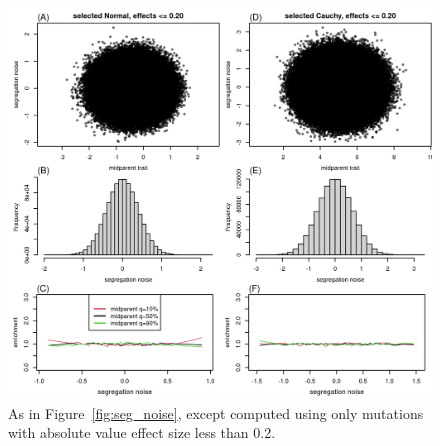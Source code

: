 \documentclass{article}
\newcommand{\1}{\mathbbm{1}}
\theoremstyle{remark}
\theoremstyle{definition}
\newif\ifsubmission
\begin{document}
\begin{figure}
    \begin{center}
        \includegraphics{sims/selected_seg_noise_small}
    \end{center}
    \caption{
        As in Figure~\ref{fig:seg_noise},
        except computed using only mutations with absolute value effect size less than 0.2.
        \label{fig:sel_seg_noise_small}
    }
\end{figure}


\end{document}
